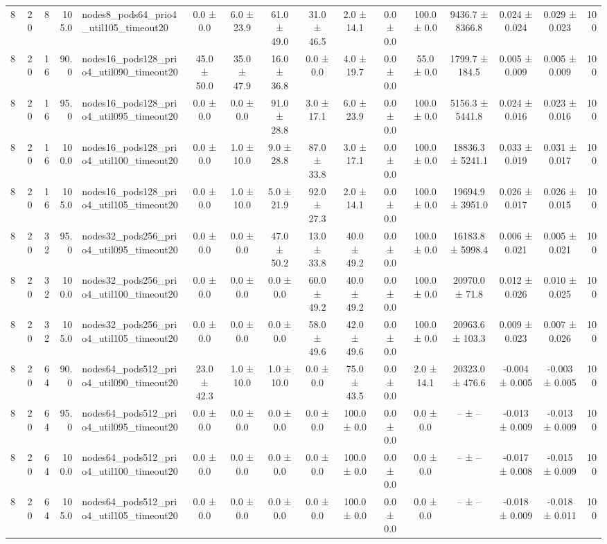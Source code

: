 \begin{tabular}{r r r r l c c c c c c c c c c r}
8 & 20 & 8 & 105.0 & nodes8\_pods64\_prio4\_util105\_timeout20 & 0.0 ± 0.0 & 6.0 ± 23.9 & 61.0 ± 49.0 & 31.0 ± 46.5 & 2.0 ± 14.1 & 0.0 ± 0.0 & 100.0 ± 0.0 & 9436.7 ± 8366.8 & 0.024 ± 0.024 & 0.029 ± 0.023 & 100 \\
8 & 20 & 16 & 90.0 & nodes16\_pods128\_prio4\_util090\_timeout20 & 45.0 ± 50.0 & 35.0 ± 47.9 & 16.0 ± 36.8 & 0.0 ± 0.0 & 4.0 ± 19.7 & 0.0 ± 0.0 & 55.0 ± 0.0 & 1799.7 ± 184.5 & 0.005 ± 0.009 & 0.005 ± 0.009 & 100 \\
8 & 20 & 16 & 95.0 & nodes16\_pods128\_prio4\_util095\_timeout20 & 0.0 ± 0.0 & 0.0 ± 0.0 & 91.0 ± 28.8 & 3.0 ± 17.1 & 6.0 ± 23.9 & 0.0 ± 0.0 & 100.0 ± 0.0 & 5156.3 ± 5441.8 & 0.024 ± 0.016 & 0.023 ± 0.016 & 100 \\
8 & 20 & 16 & 100.0 & nodes16\_pods128\_prio4\_util100\_timeout20 & 0.0 ± 0.0 & 1.0 ± 10.0 & 9.0 ± 28.8 & 87.0 ± 33.8 & 3.0 ± 17.1 & 0.0 ± 0.0 & 100.0 ± 0.0 & 18836.3 ± 5241.1 & 0.033 ± 0.019 & 0.031 ± 0.017 & 100 \\
8 & 20 & 16 & 105.0 & nodes16\_pods128\_prio4\_util105\_timeout20 & 0.0 ± 0.0 & 1.0 ± 10.0 & 5.0 ± 21.9 & 92.0 ± 27.3 & 2.0 ± 14.1 & 0.0 ± 0.0 & 100.0 ± 0.0 & 19694.9 ± 3951.0 & 0.026 ± 0.017 & 0.026 ± 0.015 & 100 \\
8 & 20 & 32 & 95.0 & nodes32\_pods256\_prio4\_util095\_timeout20 & 0.0 ± 0.0 & 0.0 ± 0.0 & 47.0 ± 50.2 & 13.0 ± 33.8 & 40.0 ± 49.2 & 0.0 ± 0.0 & 100.0 ± 0.0 & 16183.8 ± 5998.4 & 0.006 ± 0.021 & 0.005 ± 0.021 & 100 \\
8 & 20 & 32 & 100.0 & nodes32\_pods256\_prio4\_util100\_timeout20 & 0.0 ± 0.0 & 0.0 ± 0.0 & 0.0 ± 0.0 & 60.0 ± 49.2 & 40.0 ± 49.2 & 0.0 ± 0.0 & 100.0 ± 0.0 & 20970.0 ± 71.8 & 0.012 ± 0.026 & 0.010 ± 0.025 & 100 \\
8 & 20 & 32 & 105.0 & nodes32\_pods256\_prio4\_util105\_timeout20 & 0.0 ± 0.0 & 0.0 ± 0.0 & 0.0 ± 0.0 & 58.0 ± 49.6 & 42.0 ± 49.6 & 0.0 ± 0.0 & 100.0 ± 0.0 & 20963.6 ± 103.3 & 0.009 ± 0.023 & 0.007 ± 0.026 & 100 \\
8 & 20 & 64 & 90.0 & nodes64\_pods512\_prio4\_util090\_timeout20 & 23.0 ± 42.3 & 1.0 ± 10.0 & 1.0 ± 10.0 & 0.0 ± 0.0 & 75.0 ± 43.5 & 0.0 ± 0.0 & 2.0 ± 14.1 & 20323.0 ± 476.6 & -0.004 ± 0.005 & -0.003 ± 0.005 & 100 \\
8 & 20 & 64 & 95.0 & nodes64\_pods512\_prio4\_util095\_timeout20 & 0.0 ± 0.0 & 0.0 ± 0.0 & 0.0 ± 0.0 & 0.0 ± 0.0 & 100.0 ± 0.0 & 0.0 ± 0.0 & 0.0 ± 0.0 & -- ± -- & -0.013 ± 0.009 & -0.013 ± 0.009 & 100 \\
8 & 20 & 64 & 100.0 & nodes64\_pods512\_prio4\_util100\_timeout20 & 0.0 ± 0.0 & 0.0 ± 0.0 & 0.0 ± 0.0 & 0.0 ± 0.0 & 100.0 ± 0.0 & 0.0 ± 0.0 & 0.0 ± 0.0 & -- ± -- & -0.017 ± 0.008 & -0.015 ± 0.009 & 100 \\
8 & 20 & 64 & 105.0 & nodes64\_pods512\_prio4\_util105\_timeout20 & 0.0 ± 0.0 & 0.0 ± 0.0 & 0.0 ± 0.0 & 0.0 ± 0.0 & 100.0 ± 0.0 & 0.0 ± 0.0 & 0.0 ± 0.0 & -- ± -- & -0.018 ± 0.009 & -0.018 ± 0.011 & 100 \\
\bottomrule
\end{tabular}
